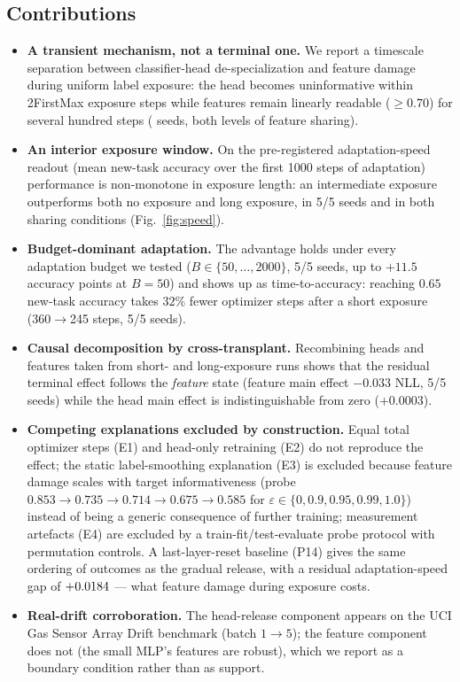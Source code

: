 \documentclass[review,12pt]{elsarticle}
\begin{document}
\subsection{Contributions}
\begin{itemize}
  \item \textbf{A transient mechanism, not a terminal one.} We report a
  timescale separation between classifier-head de-specialization and feature
  damage during uniform label exposure: the head becomes uninformative within
  \A2FirstMax{} exposure steps while features remain linearly readable
  ($\ge 0.70$) for several hundred steps (\WinSeeds{} seeds, both levels of
  feature sharing).
  \item \textbf{An interior exposure window.} On the pre-registered
  adaptation-speed readout (mean new-task accuracy over the first 1000 steps
  of adaptation) performance is non-monotone in exposure length: an
  intermediate exposure outperforms both no exposure and long exposure, in
  5/5 seeds and in both sharing conditions (Fig.~\ref{fig:speed}).
  \item \textbf{Budget-dominant adaptation.} The advantage holds under every
  adaptation budget we tested ($B\in\{50,\dots,2000\}$, 5/5 seeds, up to
  $+11.5$ accuracy points at $B{=}50$) and shows up as time-to-accuracy:
  reaching $0.65$ new-task accuracy takes $32\%$ fewer optimizer steps after
  a short exposure (360$\to$245 steps, 5/5 seeds).
  \item \textbf{Causal decomposition by cross-transplant.} Recombining heads
  and features taken from short- and long-exposure runs shows that the
  residual terminal effect follows the \emph{feature} state
  (feature main effect $-0.033$ NLL, 5/5 seeds) while the head main effect is
  indistinguishable from zero ($+0.0003$).
  \item \textbf{Competing explanations excluded by construction.} Equal total
  optimizer steps (E1) and head-only retraining (E2) do not reproduce the
  effect; the static label-smoothing explanation (E3) is excluded because
  feature damage scales with target informativeness (probe
  $0.853\to0.735\to0.714\to0.675\to0.585$ for
  $\varepsilon\in\{0,0.9,0.95,0.99,1.0\}$) instead of being a generic
  consequence of further training; measurement artefacts (E4) are excluded by
  a train-fit/test-evaluate probe protocol with permutation controls. A
  last-layer-reset baseline (P14) gives the same ordering of outcomes as the
  gradual release, with a residual adaptation-speed gap of
  $+0.0184$ --- what feature damage during exposure costs.
  \item \textbf{Real-drift corroboration.} The head-release component appears
  on the UCI Gas Sensor Array Drift benchmark (batch $1\to5$); the feature
  component does not (the small MLP's features are robust), which we report as
  a boundary condition rather than as support.
\end{itemize}
\end{document}
